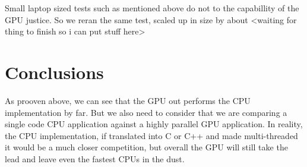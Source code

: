 \documentclass[12pt]{article}
\begin{document}
Small laptop sized tests such as mentioned above do not to the capabillity of the GPU justice. So we reran the same test, scaled up in size by about <waiting for thing to finish so i can put stuff here>

\section{Conclusions}
As prooven above, we can see that the GPU out performs the CPU implementation by far. But we also need to consider that we are comparing a single code CPU application against a highly parallel GPU application. In reality, the CPU implementation, if translated into C or C++ and made multi-threaded it would be a much closer competition, but overall the GPU will still take the lead and leave even the fastest CPUs in the dust.



\end{document}
